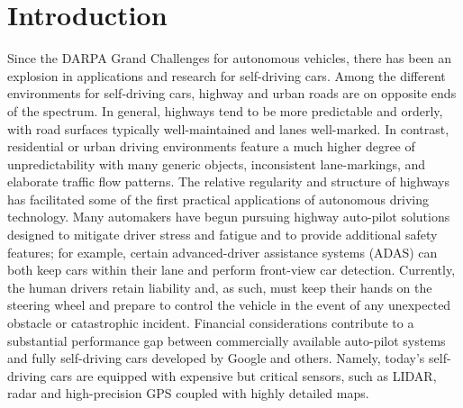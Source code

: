 \documentclass[journal]{IEEEtran}
\begin{document}
\section{Introduction}
Since the DARPA Grand Challenges for autonomous vehicles, there has been an explosion in applications and research for self-driving cars. Among the different environments for self-driving cars, highway and urban roads are on opposite ends of the spectrum. In general, highways tend to be more predictable and orderly, with road surfaces typically well-maintained and lanes well-marked. In contrast, residential or urban driving environments feature a much higher degree of unpredictability with many generic objects, inconsistent lane-markings, and elaborate traffic flow patterns. The relative regularity and structure of highways has facilitated some of the first practical applications of autonomous driving technology. Many automakers have begun pursuing highway auto-pilot solutions designed to mitigate driver stress and fatigue and to provide additional safety features; for example, certain advanced-driver assistance systems (ADAS) can both keep cars within their lane and perform front-view car detection. Currently, the human drivers retain liability and, as such, must keep their hands on the steering wheel and prepare to control the vehicle in the event of any unexpected obstacle or catastrophic incident. Financial considerations contribute to a substantial performance gap between commercially available auto-pilot systems and fully self-driving cars developed by Google and others. Namely, today's self-driving cars are equipped with expensive but critical sensors, such as LIDAR, radar and high-precision GPS coupled with highly detailed maps.
\end{document}

